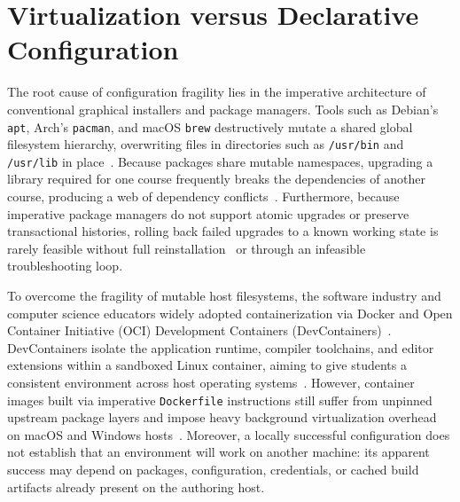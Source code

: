 \section{Virtualization versus Declarative Configuration}

The root cause of configuration fragility lies in the imperative architecture of conventional
graphical installers and package managers. Tools such as Debian's \texttt{apt},
Arch's \texttt{pacman}, and macOS \texttt{brew} destructively mutate a shared global
filesystem hierarchy, overwriting files in directories such as \texttt{/usr/bin} and
\texttt{/usr/lib} in place~\cite{dolstraNixSafePolicyFree,duNixRescueReproducible2026a}.
Because packages share mutable namespaces, upgrading a library required for one
course frequently breaks the dependencies of another course, producing a web of dependency
conflicts~\cite{dolstraNixSafePolicyFree,hollandResearchIssuesNoFutz2001}.
Furthermore, because imperative package managers do not support atomic upgrades or
preserve transactional histories, rolling back failed upgrades to a known
working state is rarely feasible without full reinstallation~\cite{dolstraNixSafePolicyFree,hollandResearchIssuesNoFutz2001}
or through an infeasible troubleshooting loop.

To overcome the fragility of mutable host filesystems, the software industry and computer
science educators widely adopted containerization via Docker and Open Container Initiative
(OCI) Development Containers (DevContainers)~\cite{valstarUsingDevContainersStandardize2020,malanContainerizingCS50Standardizing2024}.
DevContainers isolate the application runtime, compiler toolchains, and editor
extensions within a sandboxed Linux container, aiming to give students a consistent
environment across host operating systems~\cite{valstarUsingDevContainersStandardize2020}.
However, container images built via imperative \texttt{Dockerfile} instructions
still suffer from unpinned upstream package layers and impose heavy background
virtualization overhead on macOS and Windows hosts~\cite{valstarUsingDevContainersStandardize2020,duNixRescueReproducible2026a,NixBetterDocker2024}.
Moreover, a locally successful configuration does not establish that an
environment will work on another machine: its apparent success may depend on packages,
configuration, credentials, or cached build artifacts already present on the
authoring host.

